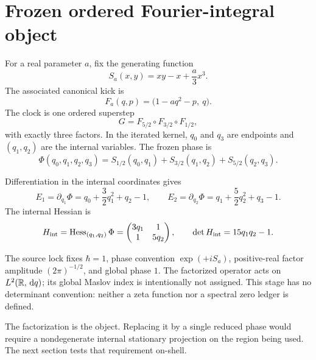 \section{Frozen ordered Fourier-integral object}

For a real parameter \(a\), fix the generating function
\[
 S_a(x,y)=xy-x+\frac{a}{3}x^3.
\]
The associated canonical kick is
\[
 F_a(q,p)=\bigl(1-aq^2-p,\ q\bigr).
\]
The clock is one ordered superstep
\[
 G=F_{5/2}\circ F_{3/2}\circ F_{1/2},
\]
with exactly three factors.  In the iterated kernel, \(q_0\) and \(q_3\) are
endpoints and \((q_1,q_2)\) are the internal variables.  The frozen phase is
\[
 \Phi(q_0,q_1,q_2,q_3)
 =S_{1/2}(q_0,q_1)+S_{3/2}(q_1,q_2)+S_{5/2}(q_2,q_3).
\]

Differentiation in the internal coordinates gives
\[
 E_1=\partial_{q_1}\Phi
 =q_0+\frac32q_1^2+q_2-1,
 \qquad
 E_2=\partial_{q_2}\Phi
 =q_1+\frac52q_2^2+q_3-1.
\]
The internal Hessian is
\[
 H_{\mathrm{int}}
 =\operatorname{Hess}_{(q_1,q_2)}\Phi
 =\begin{pmatrix}3q_1&1\\1&5q_2\end{pmatrix},
 \qquad
 \det H_{\mathrm{int}}=15q_1q_2-1.
\]

The source lock fixes \(\hbar=1\), phase convention
\(\exp(+iS_a)\), positive-real factor amplitude \((2\pi)^{-1/2}\), and global
phase \(1\).  The factorized operator acts on \(L^2(\mathbb{R},\,\mathrm{d} q)\); its global
Maslov index is intentionally not assigned.  This stage has no determinant
convention: neither a zeta function nor a spectral zero ledger is defined.

\begin{remark}
The factorization is the object.  Replacing it by a single reduced phase would
require a nondegenerate internal stationary projection on the region being
used.  The next section tests that requirement on-shell.
\end{remark}
